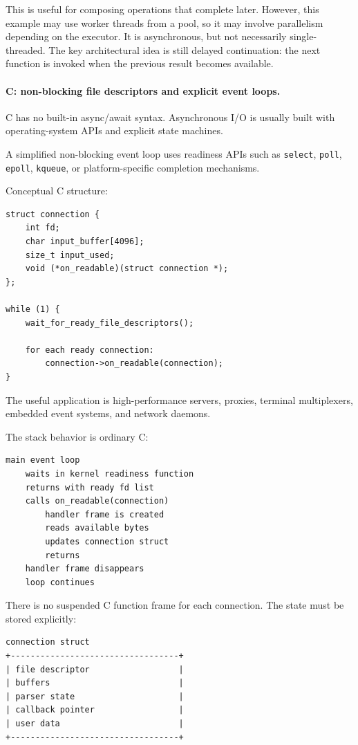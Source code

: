 This is useful for composing operations that complete later. However, this example may use worker threads from a pool, so it may involve parallelism depending on the executor. It is asynchronous, but not necessarily single-threaded. The key architectural idea is still delayed continuation: the next function is invoked when the previous result becomes available.

\paragraph{C: non-blocking file descriptors and explicit event loops.}

C has no built-in async/await syntax. Asynchronous I/O is usually built with operating-system APIs and explicit state machines.

A simplified non-blocking event loop uses readiness APIs such as \texttt{select}, \texttt{poll}, \texttt{epoll}, \texttt{kqueue}, or platform-specific completion mechanisms.

Conceptual C structure:

\begin{verbatim}
struct connection {
    int fd;
    char input_buffer[4096];
    size_t input_used;
    void (*on_readable)(struct connection *);
};

while (1) {
    wait_for_ready_file_descriptors();

    for each ready connection:
        connection->on_readable(connection);
}
\end{verbatim}

The useful application is high-performance servers, proxies, terminal multiplexers, embedded event systems, and network daemons.

The stack behavior is ordinary C:

\begin{verbatim}
main event loop
    waits in kernel readiness function
    returns with ready fd list
    calls on_readable(connection)
        handler frame is created
        reads available bytes
        updates connection struct
        returns
    handler frame disappears
    loop continues
\end{verbatim}

There is no suspended C function frame for each connection. The state must be stored explicitly:

\begin{verbatim}
connection struct
+----------------------------------+
| file descriptor                  |
| buffers                          |
| parser state                     |
| callback pointer                 |
| user data                        |
+----------------------------------+
\end{verbatim}

